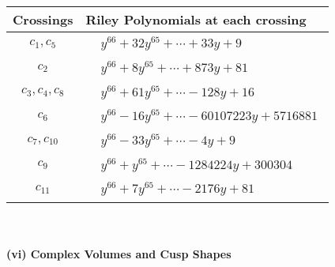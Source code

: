 \documentclass[1p]{elsarticle_modified}
\theoremstyle{definition}
\begin{document}
\begin{tabular}{m{50pt}|m{274pt}}
Crossings & \hspace{64pt}Riley Polynomials at each crossing \\
\hline $$\begin{aligned}c_{1},c_{5}\end{aligned}$$&$\begin{aligned}
&y^{66}+32 y^{65}+\cdots+33 y+9
\end{aligned}$\\
\hline $$\begin{aligned}c_{2}\end{aligned}$$&$\begin{aligned}
&y^{66}+8 y^{65}+\cdots+873 y+81
\end{aligned}$\\
\hline $$\begin{aligned}c_{3},c_{4},c_{8}\end{aligned}$$&$\begin{aligned}
&y^{66}+61 y^{65}+\cdots-128 y+16
\end{aligned}$\\
\hline $$\begin{aligned}c_{6}\end{aligned}$$&$\begin{aligned}
&y^{66}-16 y^{65}+\cdots-60107223 y+5716881
\end{aligned}$\\
\hline $$\begin{aligned}c_{7},c_{10}\end{aligned}$$&$\begin{aligned}
&y^{66}-33 y^{65}+\cdots-4 y+9
\end{aligned}$\\
\hline $$\begin{aligned}c_{9}\end{aligned}$$&$\begin{aligned}
&y^{66}+y^{65}+\cdots-1284224 y+300304
\end{aligned}$\\
\hline $$\begin{aligned}c_{11}\end{aligned}$$&$\begin{aligned}
&y^{66}+7 y^{65}+\cdots-2176 y+81
\end{aligned}$\\
\hline
\end{tabular}\\~\\
\newpage\flushleft \textbf{(vi) Complex Volumes and Cusp Shapes}
\end{document}
